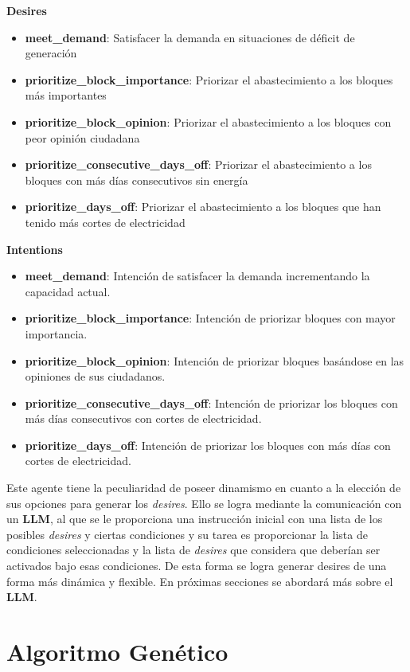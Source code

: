 \documentclass[twocolumn, fontsize=10pt]{article}
\begin{document}
\textbf{Desires}

\begin{itemize}
  \item \textbf{meet\_demand}: Satisfacer la demanda en situaciones de déficit de generación
  \item \textbf{prioritize\_block\_importance}: Priorizar el abastecimiento a los bloques más importantes
  \item \textbf{prioritize\_block\_opinion}: Priorizar el abastecimiento a los bloques con peor opinión ciudadana
  \item \textbf{prioritize\_consecutive\_days\_off}: Priorizar el abastecimiento a los bloques con más días consecutivos sin energía
  \item \textbf{prioritize\_days\_off}: Priorizar el abastecimiento a los bloques que han tenido más cortes de electricidad
\end{itemize}
\textbf{Intentions}

\begin{itemize}
  \item \textbf{meet\_demand}: Intención de satisfacer la demanda incrementando la capacidad actual.
  \item \textbf{prioritize\_block\_importance}: Intención de priorizar bloques con mayor importancia.
  \item \textbf{prioritize\_block\_opinion}: Intención de priorizar bloques basándose en las opiniones de sus ciudadanos.
  \item \textbf{prioritize\_consecutive\_days\_off}: Intención de priorizar los bloques con más días consecutivos con cortes de electricidad.
  \item \textbf{prioritize\_days\_off}: Intención de priorizar los bloques con más días con cortes de electricidad.
\end{itemize}

Este agente tiene la peculiaridad de poseer dinamismo en cuanto a la elección de sus opciones
para generar los \textit{desires}. Ello se logra mediante la comunicación con un \textbf{LLM}, al que se le proporciona una instrucción inicial con una lista de los
posibles \textit{desires} y ciertas condiciones y su tarea es proporcionar la lista de condiciones seleccionadas y la lista de \textit{desires} que considera que deberían ser activados
bajo esas condiciones. De esta forma se logra generar desires de una forma más dinámica y flexible. En próximas secciones se abordará más sobre el \textbf{LLM}.
\section{Algoritmo Genético}
\end{document}
